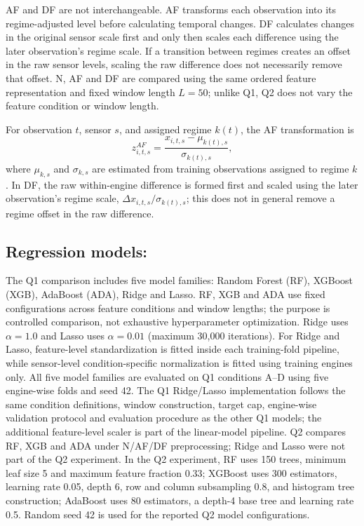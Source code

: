 \documentclass[10pt,a4paper]{article}
\begin{document}
AF and DF are not interchangeable. AF transforms each observation into its regime-adjusted level before calculating temporal changes. DF calculates changes in the original sensor scale first and only then scales each difference using the later observation's regime scale. If a transition between regimes creates an offset in the raw sensor levels, scaling the raw difference does not necessarily remove that offset. N, AF and DF are compared using the same ordered feature representation and fixed window length $L=50$; unlike Q1, Q2 does not vary the feature condition or window length.

For observation $t$, sensor $s$, and assigned regime $k(t)$, the AF transformation is
\[
z^{AF}_{i,t,s}=\frac{x_{i,t,s}-\mu_{k(t),s}}{\sigma_{k(t),s}},
\]
where $\mu_{k,s}$ and $\sigma_{k,s}$ are estimated from training observations assigned to regime $k$. In DF, the raw within-engine difference is formed first and scaled using the later observation's regime scale, $\Delta x_{i,t,s}/\sigma_{k(t),s}$; this does not in general remove a regime offset in the raw difference.

\subsection{Regression models:}
The Q1 comparison includes five model families: Random Forest (RF), XGBoost (XGB), AdaBoost (ADA), Ridge and Lasso. RF, XGB and ADA use fixed configurations across feature conditions and window lengths; the purpose is controlled comparison, not exhaustive hyperparameter optimization. Ridge uses $\alpha=1.0$ and Lasso uses $\alpha=0.01$ (maximum 30,000 iterations). For Ridge and Lasso, feature-level standardization is fitted inside each training-fold pipeline, while sensor-level condition-specific normalization is fitted using training engines only. All five model families are evaluated on Q1 conditions A--D using five engine-wise folds and seed 42. The Q1 Ridge/Lasso implementation follows the same condition definitions, window construction, target cap, engine-wise validation protocol and evaluation procedure as the other Q1 models; the additional feature-level scaler is part of the linear-model pipeline. Q2 compares RF, XGB and ADA under N/AF/DF preprocessing; Ridge and Lasso were not part of the Q2 experiment. In the Q2 experiment, RF uses 150 trees, minimum leaf size 5 and maximum feature fraction 0.33; XGBoost uses 300 estimators, learning rate 0.05, depth 6, row and column subsampling 0.8, and histogram tree construction; AdaBoost uses 80 estimators, a depth-4 base tree and learning rate 0.5. Random seed 42 is used for the reported Q2 model configurations.
\end{document}

